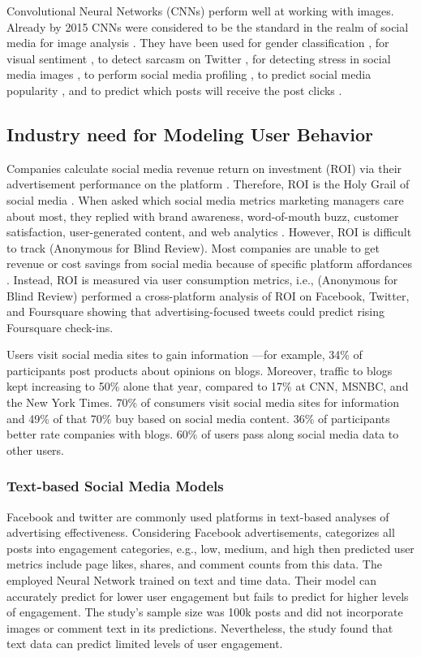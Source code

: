 \documentclass[mksc,blindrev]{informs3} %
\begin{document}
Convolutional Neural Networks (CNNs) perform well at working with images. Already by 2015 CNNs were considered to be the standard in the realm of social media for image analysis \cite{Hassner2015}. They have been used for gender classification \cite{Hassner2015}, for visual sentiment \cite{Segalin2017,Xu2014}, to detect sarcasm on Twitter \cite{Poria2016}, for detecting stress in social media images \cite{Lin2014}, to perform social media profiling \cite{Segalin2017}, to predict social media popularity \cite{Gelli2015}, and to predict which posts will receive the post clicks \cite{Khosla2014}.

\subsection{Industry need for Modeling User Behavior}

Companies calculate social media revenue return on investment (ROI) via their advertisement performance on the platform \cite{Fisher2009}. Therefore, ROI is the Holy Grail of social media \cite{Fisher2009}. When asked which social media metrics marketing managers care about most, they replied with brand awareness, word-of-mouth buzz, customer satisfaction, user-generated content, and web analytics \cite{Tiago2014}. However, ROI is difficult to track (Anonymous for Blind Review). Most companies are unable to get revenue or cost savings from social media because of specific platform affordances \cite{Romero2011}. Instead, ROI is measured via user consumption metrics, i.e., (Anonymous for Blind Review) performed a cross-platform analysis of ROI on Facebook, Twitter, and Foursquare showing that advertising-focused tweets could predict rising Foursquare check-ins.

Users visit social media sites to gain information \cite{Fisher2009}—for example, 34\% of participants post products about opinions on blogs. Moreover, traffic to blogs kept increasing to 50\% alone that year, compared to 17\% at CNN, MSNBC, and the New York Times. 70\% of consumers visit social media sites for information and 49\% of that 70\% buy based on social media content. 36\% of participants better rate companies with blogs. 60\% of users pass along social media data to other users. 

\subsubsection{Text-based Social Media Models}
Facebook and twitter are commonly used platforms in text-based analyses of advertising effectiveness. Considering Facebook advertisements, \cite{Straton2017} categorizes all posts into engagement categories, e.g., low, medium, and high then predicted user metrics include page likes, shares, and comment counts from this data. The employed Neural Network trained on text and time data. Their model can accurately predict for lower user engagement but fails to predict for higher levels of engagement. The study’s sample size was 100k posts and did not incorporate images or comment text in its predictions. Nevertheless, the study found that text data can predict limited levels of user engagement.
\end{document}
